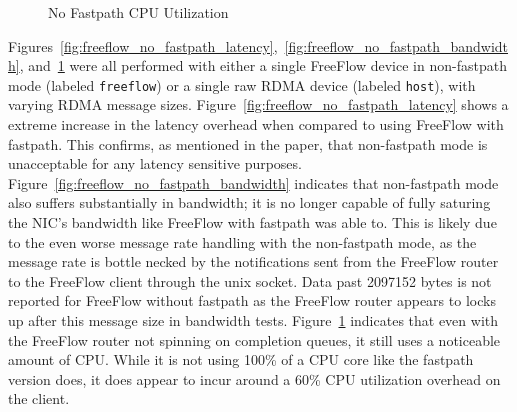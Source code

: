 \documentclass[12pt,titlepage]{article}
\begin{document}
\begin{figure}
	\centering
	\caption{No Fastpath CPU Utilization}%
	\label{fig:freeflow_no_fastpath_cpu}
\end{figure}

Figures~\ref{fig:freeflow_no_fastpath_latency},~\ref{fig:freeflow_no_fastpath_bandwidth}, and~\ref{fig:freeflow_no_fastpath_cpu} were all performed with either a single FreeFlow device in non-fastpath mode (labeled \texttt{freeflow}) or a single raw RDMA device (labeled \texttt{host}), with varying RDMA message sizes.
Figure~\ref{fig:freeflow_no_fastpath_latency} shows a extreme increase in the latency overhead when compared to using FreeFlow with fastpath.
This confirms, as mentioned in the paper, that non-fastpath mode is unacceptable for any latency sensitive purposes.
Figure~\ref{fig:freeflow_no_fastpath_bandwidth} indicates that non-fastpath mode also suffers substantially in bandwidth; 
it is no longer capable of fully saturing the NIC's bandwidth like FreeFlow with fastpath was able to.
This is likely due to the even worse message rate handling with the non-fastpath mode, as the message rate is bottle necked by the notifications sent from the FreeFlow router to the FreeFlow client through the unix socket.
Data past 2097152 bytes is not reported for FreeFlow without fastpath as the FreeFlow router appears to locks up after this message size in bandwidth tests.
Figure~\ref{fig:freeflow_no_fastpath_cpu} indicates that even with the FreeFlow router not spinning on completion queues, it still uses a noticeable amount of CPU\@. 
While it is not using 100\% of a CPU core like the fastpath version does, it does appear to incur around a 60\% CPU utilization overhead on the client.
\end{document}
